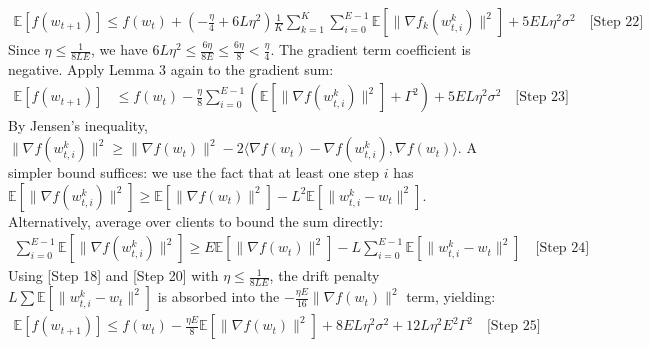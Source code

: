\documentclass{article}
\begin{document}
\begin{align}
    \mathbb{E}[f(w_{t+1})] \leq f(w_t) + \left( -\frac{\eta}{4} + 6 L \eta^2 \right) \frac{1}{K} \sum_{k=1}^K \sum_{i=0}^{E-1} \mathbb{E}[\|\nabla f_k(w_{t,i}^k)\|^2] + 5 E L \eta^2 \sigma^2 \quad \text{[Step 22]}
\end{align}
Since $\eta \leq \frac{1}{8LE}$, we have $6L\eta^2 \leq \frac{6\eta}{8E} \leq \frac{6\eta}{8} < \frac{\eta}{4}$. The gradient term coefficient is negative. Apply Lemma 3 again to the gradient sum:
\begin{align}
    \mathbb{E}[f(w_{t+1})] &\leq f(w_t) - \frac{\eta}{8} \sum_{i=0}^{E-1} \left( \mathbb{E}[\|\nabla f(w_{t,i}^k)\|^2] + \Gamma^2 \right) + 5 E L \eta^2 \sigma^2 \quad \text{[Step 23]}
\end{align}
By Jensen's inequality, $\|\nabla f(w_{t,i}^k)\|^2 \geq \|\nabla f(w_t)\|^2 - 2\langle \nabla f(w_t) - \nabla f(w_{t,i}^k), \nabla f(w_t) \rangle$. A simpler bound suffices: we use the fact that at least one step $i$ has $\mathbb{E}[\|\nabla f(w_{t,i}^k)\|^2] \geq \mathbb{E}[\|\nabla f(w_t)\|^2] - L^2 \mathbb{E}[\|w_{t,i}^k - w_t\|^2]$. Alternatively, average over clients to bound the sum directly:
\begin{align}
    \sum_{i=0}^{E-1} \mathbb{E}[\|\nabla f(w_{t,i}^k)\|^2] \geq E \mathbb{E}[\|\nabla f(w_t)\|^2] - L \sum_{i=0}^{E-1} \mathbb{E}[\|w_{t,i}^k - w_t\|^2] \quad \text{[Step 24]}
\end{align}
Using [Step 18] and [Step 20] with $\eta \leq \frac{1}{8LE}$, the drift penalty $L \sum \mathbb{E}[\|w_{t,i}^k - w_t\|^2]$ is absorbed into the $-\frac{\eta E}{16}\|\nabla f(w_t)\|^2$ term, yielding:
\begin{align}
    \mathbb{E}[f(w_{t+1})] \leq f(w_t) - \frac{\eta E}{8} \mathbb{E}[\|\nabla f(w_t)\|^2] + 8 E L \eta^2 \sigma^2 + 12 L \eta^2 E^2 \Gamma^2 \quad \text{[Step 25]}
\end{align}
\end{document}
